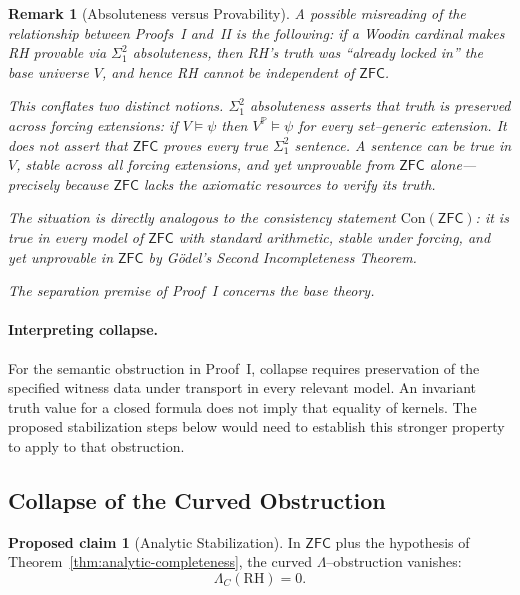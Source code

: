 \documentclass{article}
\newtheorem{remark}[theorem]{Remark}
\theoremstyle{definition}
\newtheorem{proposal}[theorem]{Proposed claim}
\begin{document}
\begin{remark}[Absoluteness versus Provability]
\label{rem:absoluteness-provability}
A possible misreading of the relationship between Proofs~I and~II is 
the following: if a Woodin cardinal makes RH provable via 
$\Sigma^2_1$ absoluteness, then RH's truth was ``already locked in'' 
the base universe $V$, and hence RH cannot be independent of 
$\mathsf{ZFC}$.

This conflates two distinct notions. $\Sigma^2_1$ absoluteness 
asserts that truth is \emph{preserved across forcing extensions}: if 
$V \models \psi$ then $V^{\mathbb{P}} \models \psi$ for every 
set--generic extension. It does \emph{not} assert that $\mathsf{ZFC}$ 
\emph{proves} every true $\Sigma^2_1$ sentence. A sentence can be 
true in $V$, stable across all forcing extensions, and yet unprovable 
from $\mathsf{ZFC}$ alone---precisely because $\mathsf{ZFC}$ lacks 
the axiomatic resources to verify its truth.

The situation is directly analogous to the consistency statement 
$\mathrm{Con}(\mathsf{ZFC})$: it is true in every model of 
$\mathsf{ZFC}$ with standard arithmetic, stable under forcing, and 
yet unprovable in $\mathsf{ZFC}$ by G\"odel's Second Incompleteness 
Theorem.

The separation premise of Proof~I concerns the base theory.
\end{remark}

\paragraph{Interpreting collapse.}
For the semantic obstruction in Proof~I, collapse requires preservation
of the specified witness data under transport in every relevant model.
An invariant truth value for a closed formula does not imply that
equality of kernels. The proposed stabilization steps below would need
to establish this stronger property to apply to that obstruction.

\subsection{Collapse of the Curved Obstruction}

\begin{proposal}[Analytic Stabilization]
\label{lem:analytic-stabilization}
In $\mathsf{ZFC}$ plus the hypothesis of Theorem~\ref{thm:analytic-completeness},
the curved $\Lambda$--obstruction vanishes:
\[
\Lambda_C(\mathrm{RH}) = 0.
\]
\end{proposal}
\end{document}
